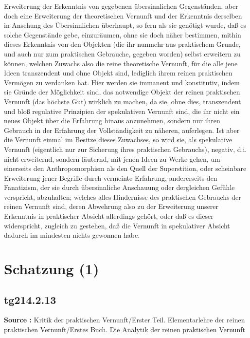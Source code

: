 \documentclass[a4paper,12pt,twoside]{book}
\newcommand{\unnumberedsection}[1]{
	\section*{#1}
	\addcontentsline{toc}{section}{#1}
	\markright{#1}
}
\begin{document}
Erweiterung der Erkenntnis von gegebenen übersinnlichen Gegenständen, aber doch eine Erweiterung der theoretischen Vernunft und der Erkenntnis derselben in Ansehung des Übersinnlichen überhaupt, so fern als sie genötigt wurde, daß es solche Gegenstände gebe, einzuräumen, ohne sie doch näher bestimmen, mithin dieses Erkenntnis von den Objekten (die ihr nunmehr aus praktischem Grunde, und auch nur zum praktischen Gebrauche, gegeben worden) selbst erweitern zu können, welchen Zuwachs also die reine theoretische Vernunft, für die alle jene Ideen transzendent und ohne Objekt sind, lediglich ihrem reinen praktischen Vermögen zu verdanken hat. Hier werden sie immanent und konstitutiv, indem sie Gründe der Möglichkeit sind, das notwendige Objekt der reinen praktischen Vernunft (das höchste Gut) wirklich zu machen, da sie, ohne dies, transzendent und bloß regulative Prinzipien der spekulativen Vernunft sind, die ihr nicht ein neues Objekt über die Erfahrung hinaus anzunehmen, sondern nur ihren Gebrauch in der Erfahrung der Vollständigkeit zu näheren, auferlegen. Ist aber die Vernunft einmal im Besitze dieses Zuwachses, so wird sie, als spekulative Vernunft (eigentlich nur zur Sicherung ihres praktischen Gebrauchs), negativ, d.i. nicht erweiternd, sondern läuternd, mit jenen Ideen zu Werke gehen, um einerseits den Anthropomorphism als den Quell der Superstition, oder scheinbare Erweiterung jener Begriffe durch vermeinte Erfahrung, andererseits den Fanatizism, der sie durch übersinnliche Anschauung oder dergleichen Gefühle verspricht, abzuhalten; welches alles Hindernisse des praktischen Gebrauchs der reinen Vernunft sind, deren Abwehrung also zu der Erweiterung unserer Erkenntnis in praktischer Absicht allerdings gehört, oder daß es dieser widerspricht,  zugleich zu gestehen, daß die Vernunft in spekulativer Absicht dadurch im mindesten nichts gewonnen habe. 
	
	\unnumberedsection{Schatzung (1)} 
	\subsection*{tg214.2.13} 
	\textbf{Source : }Kritik der praktischen Vernunft/Erster Teil. Elementarlehre der reinen praktischen Vernunft/Erstes Buch. Die Analytik der reinen praktischen Vernunft\\  
	
\end{document}
